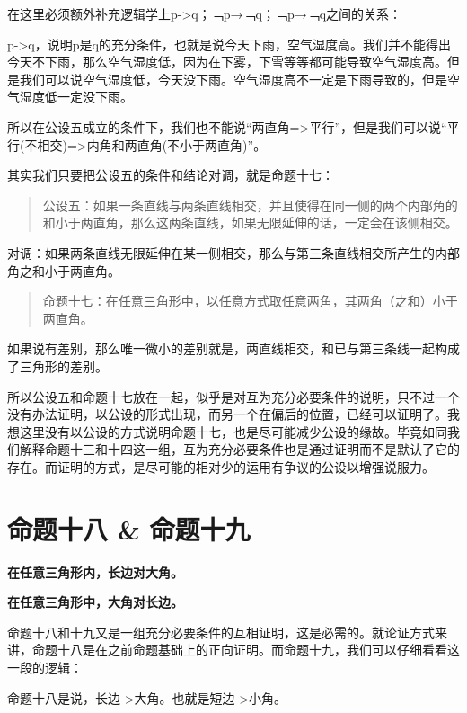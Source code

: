 \documentclass[
]{book}
\begin{document}
在这里必须额外补充逻辑学上p-\textgreater q；﹁p→﹁q；﹁p→﹁q之间的关系：

p-\textgreater q，说明p是q的充分条件，也就是说今天下雨，空气湿度高。我们并不能得出今天不下雨，那么空气湿度低，因为在下雾，下雪等等都可能导致空气湿度高。但是我们可以说空气湿度低，今天没下雨。空气湿度高不一定是下雨导致的，但是空气湿度低一定没下雨。

所以在公设五成立的条件下，我们也不能说``两直角=\textgreater 平行''，但是我们可以说``平行(不相交)=\textgreater 内角和两直角(不小于两直角)''。

其实我们只要把公设五的条件和结论对调，就是命题十七：

\begin{quote}
公设五：如果一条直线与两条直线相交，并且使得在同一侧的两个内部角的和小于两直角，那么这两条直线，如果无限延伸的话，一定会在该侧相交。
\end{quote}

对调：如果两条直线无限延伸在某一侧相交，那么与第三条直线相交所产生的内部角之和小于两直角。

\begin{quote}
命题十七：在任意三角形中，以任意方式取任意两角，其两角（之和）小于两直角。
\end{quote}

如果说有差别，那么唯一微小的差别就是，两直线相交，和已与第三条线一起构成了三角形的差别。

所以公设五和命题十七放在一起，似乎是对互为充分必要条件的说明，只不过一个没有办法证明，以公设的形式出现，而另一个在偏后的位置，已经可以证明了。我想这里没有以公设的方式说明命题十七，也是尽可能减少公设的缘故。毕竟如同我们解释命题十三和十四这一组，互为充分必要条件也是通过证明而不是默认了它的存在。而证明的方式，是尽可能的相对少的运用有争议的公设以增强说服力。

\hypertarget{ux547dux9898ux5341ux516b-ux547dux9898ux5341ux4e5d}{%
\section{命题十八 \& 命题十九}\label{ux547dux9898ux5341ux516b-ux547dux9898ux5341ux4e5d}}

\textbf{在任意三角形内，长边对大角。}

\textbf{在任意三角形中，大角对长边。}

命题十八和十九又是一组充分必要条件的互相证明，这是必需的。就论证方式来讲，命题十八是在之前命题基础上的正向证明。而命题十九，我们可以仔细看看这一段的逻辑：

命题十八是说，长边-\textgreater 大角。也就是短边-\textgreater 小角。
\end{document}
